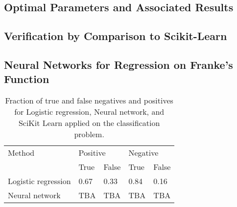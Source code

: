 \subsection*{Optimal Parameters and Associated Results}

\subsection{Verification by Comparison to Scikit-Learn}

\subsection{Neural Networks for Regression on Franke's Function}


\begin{table}[htbp]
\renewcommand{\arraystretch}{1.2}
\caption{Fraction of true and false negatives and positives for Logistic regression, Neural network, and SciKit Learn applied on the classification problem.}
	\begin{tabular}{p{18mm} l l l l}
		\toprule
		Method & \multicolumn{2}{l}{Positive} & \multicolumn{2}{l}{Negative} \\
		\cline{2-3} \cline{4-5}
		& True & False & True & False \\
		\midrule
		Logistic \newline regression & 0.67 & 0.33 & 0.84 & 0.16 \\
		Neural \newline network & TBA & TBA & TBA & TBA \\
		\bottomrule
	\end{tabular}
\label{tab:confusion}
\end{table}


